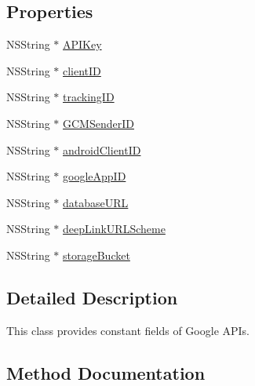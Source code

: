 \subsection*{Properties}
\begin{DoxyCompactItemize}
\item 
N\+S\+String $\ast$ \hyperlink{interface_f_i_r_options_a2f9c250e190723a628bb31448881d00e}{A\+P\+I\+Key}
\item 
N\+S\+String $\ast$ \hyperlink{interface_f_i_r_options_ac0c91f0107e390601b54ebb9b985a73d}{client\+I\+D}
\item 
N\+S\+String $\ast$ \hyperlink{interface_f_i_r_options_a2e37086e6f2db962592c21c467b1da26}{tracking\+I\+D}
\item 
N\+S\+String $\ast$ \hyperlink{interface_f_i_r_options_a9b1714f84847f9d9883a60b3d3e855c2}{G\+C\+M\+Sender\+I\+D}
\item 
N\+S\+String $\ast$ \hyperlink{interface_f_i_r_options_a99fa45702d3874c535b81f3168638628}{android\+Client\+I\+D}
\item 
N\+S\+String $\ast$ \hyperlink{interface_f_i_r_options_a84adb493d4f16a271904aa731e56f013}{google\+App\+I\+D}
\item 
N\+S\+String $\ast$ \hyperlink{interface_f_i_r_options_a1b580617dcf73298c00751c17f5416e7}{database\+U\+R\+L}
\item 
N\+S\+String $\ast$ \hyperlink{interface_f_i_r_options_a921544459ae221b937fea5a8d70ece2e}{deep\+Link\+U\+R\+L\+Scheme}
\item 
N\+S\+String $\ast$ \hyperlink{interface_f_i_r_options_a53cff0d6c7dfec85412f2e0c345ad7fc}{storage\+Bucket}
\end{DoxyCompactItemize}


\subsection{Detailed Description}
This class provides constant fields of Google A\+P\+Is. 

\subsection{Method Documentation}
\hypertarget{interface_f_i_r_options_a13fd9fe117657639406aa33462447397}{}
